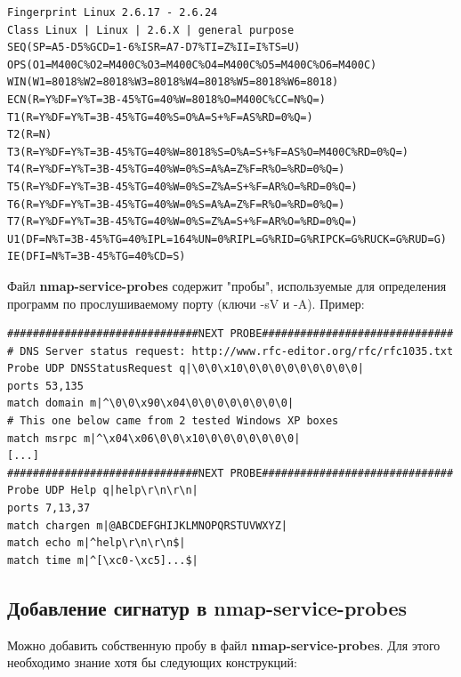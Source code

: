 \documentclass[10pt,a4paper]{article}
\begin{document}
\begin{verbatim}
Fingerprint Linux 2.6.17 - 2.6.24
Class Linux | Linux | 2.6.X | general purpose
SEQ(SP=A5-D5%GCD=1-6%ISR=A7-D7%TI=Z%II=I%TS=U)
OPS(O1=M400C%O2=M400C%O3=M400C%O4=M400C%O5=M400C%O6=M400C)
WIN(W1=8018%W2=8018%W3=8018%W4=8018%W5=8018%W6=8018)
ECN(R=Y%DF=Y%T=3B-45%TG=40%W=8018%O=M400C%CC=N%Q=)
T1(R=Y%DF=Y%T=3B-45%TG=40%S=O%A=S+%F=AS%RD=0%Q=)
T2(R=N)
T3(R=Y%DF=Y%T=3B-45%TG=40%W=8018%S=O%A=S+%F=AS%O=M400C%RD=0%Q=)
T4(R=Y%DF=Y%T=3B-45%TG=40%W=0%S=A%A=Z%F=R%O=%RD=0%Q=)
T5(R=Y%DF=Y%T=3B-45%TG=40%W=0%S=Z%A=S+%F=AR%O=%RD=0%Q=)
T6(R=Y%DF=Y%T=3B-45%TG=40%W=0%S=A%A=Z%F=R%O=%RD=0%Q=)
T7(R=Y%DF=Y%T=3B-45%TG=40%W=0%S=Z%A=S+%F=AR%O=%RD=0%Q=)
U1(DF=N%T=3B-45%TG=40%IPL=164%UN=0%RIPL=G%RID=G%RIPCK=G%RUCK=G%RUD=G)
IE(DFI=N%T=3B-45%TG=40%CD=S)
\end{verbatim}

Файл \textbf{nmap-service-probes} содержит "пробы", используемые для определения программ по прослушиваемому порту (ключи -sV и -A). Пример:

\begin{verbatim}
##############################NEXT PROBE##############################
# DNS Server status request: http://www.rfc-editor.org/rfc/rfc1035.txt
Probe UDP DNSStatusRequest q|\0\0\x10\0\0\0\0\0\0\0\0\0|
ports 53,135
match domain m|^\0\0\x90\x04\0\0\0\0\0\0\0\0|
# This one below came from 2 tested Windows XP boxes
match msrpc m|^\x04\x06\0\0\x10\0\0\0\0\0\0\0|
[...]
##############################NEXT PROBE##############################
Probe UDP Help q|help\r\n\r\n|
ports 7,13,37
match chargen m|@ABCDEFGHIJKLMNOPQRSTUVWXYZ|
match echo m|^help\r\n\r\n$|
match time m|^[\xc0-\xc5]...$|
\end{verbatim}

\subsection{Добавление сигнатур в nmap-service-probes}
\label{add_probe}

Можно добавить собственную пробу в файл \textbf{nmap-service-probes}. Для этого необходимо знание хотя бы следующих конструкций:
\end{document}

